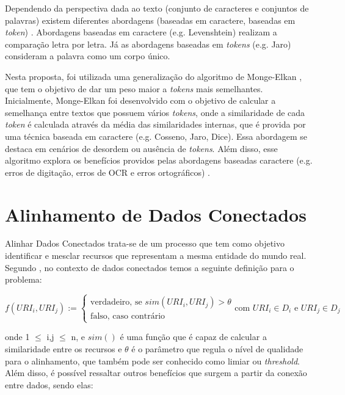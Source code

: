 Dependendo da perspectiva dada ao texto (conjunto de caracteres e conjuntos de palavras) existem diferentes abordagens (baseadas em caractere, baseadas em \textit{token}) \cite{cohen2003comparison}. Abordagens baseadas em caractere (e.g. Levenshtein) realizam a comparação letra por letra. Já as abordagens baseadas em \textit{tokens} (e.g. Jaro) consideram a palavra como um corpo único.

Nesta proposta, foi utilizada uma generalização do algoritmo de Monge-Elkan \cite{monge1996field}, que tem o objetivo de dar um peso maior a \textit{tokens} mais semelhantes. Inicialmente, Monge-Elkan foi desenvolvido com o objetivo de calcular a semelhança entre textos que possuem vários \textit{tokens}, onde a similaridade de cada \textit{token} é calculada através da média das similaridades internas, que é provida por uma técnica baseada em caractere (e.g. Cosseno, Jaro, Dice). Essa abordagem se destaca em cenários de desordem ou ausência de \textit{tokens}. Além disso, esse algoritmo explora os benefícios providos pelas abordagens baseadas caractere (e.g. erros de digitação, erros de OCR e erros ortográficos) \cite{jimenez2009generalized}.

\section{Alinhamento de Dados Conectados}

Alinhar Dados Conectados  trata-se de um processo que tem como objetivo identificar e mesclar recursos que representam a mesma entidade do mundo real. Segundo , no contexto de dados conectados temos a seguinte definição para o problema:

\begin{equation}
f\left( { URI }_{ i },{ URI }_{ j } \right) :=\begin{cases} \mbox{verdadeiro, se } sim\left( { URI }_{ i },{ URI }_{ j } \right) >\theta  \\ \mbox{falso, caso contrário} \end{cases}\mbox{com }{ URI }_{ i } \in { D }_{ i }\mbox{ e }{ URI }_{ j } \in { D }_{ j }
\end{equation}

onde 1 $\leq$ i,j $\leq$ n, e $sim()$ é uma função que é capaz de calcular a similaridade entre os recursos e $\theta$ é o parâmetro que regula o nível de qualidade para o alinhamento, que também pode ser conhecido como limiar ou \textit{threshold}. Além disso, é possível ressaltar outros benefícios que surgem a partir da conexão entre dados, sendo elas: 

